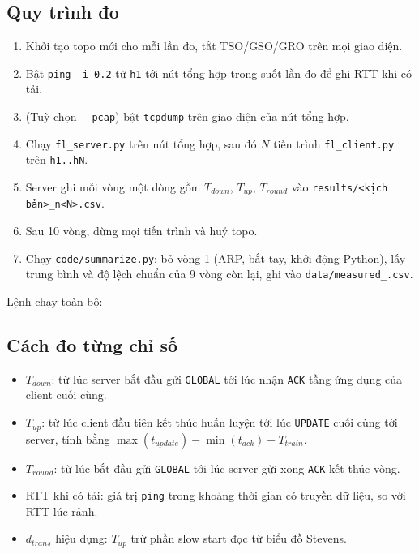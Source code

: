 \subsection{Quy trình đo}
\begin{enumerate}
    \item Khởi tạo topo mới cho mỗi lần đo, tắt TSO/GSO/GRO trên mọi giao diện.
    \item Bật \texttt{ping -i 0.2} từ \texttt{h1} tới nút tổng hợp trong suốt lần đo để ghi RTT khi có tải.
    \item (Tuỳ chọn \texttt{-{}-pcap}) bật \texttt{tcpdump} trên giao diện của nút tổng hợp.
    \item Chạy \texttt{fl\_server.py} trên nút tổng hợp, sau đó $N$ tiến trình \texttt{fl\_client.py} trên \texttt{h1..hN}.
    \item Server ghi mỗi vòng một dòng gồm $T_{down}$, $T_{up}$, $T_{round}$ vào \texttt{results/<kịch bản>\_n<N>.csv}.
    \item Sau 10 vòng, dừng mọi tiến trình và huỷ topo.
    \item Chạy \texttt{code/summarize.py}: bỏ vòng 1 (ARP, bắt tay, khởi động Python), lấy trung bình và độ lệch chuẩn của 9 vòng còn lại, ghi vào \texttt{data/measured\_<kịch bản>.csv}.
\end{enumerate}

Lệnh chạy toàn bộ:

\subsection{Cách đo từng chỉ số}
\begin{itemize}
    \item $T_{down}$: từ lúc server bắt đầu gửi \texttt{GLOBAL} tới lúc nhận \texttt{ACK} tầng ứng dụng của client cuối cùng.
    \item $T_{up}$: từ lúc client đầu tiên kết thúc huấn luyện tới lúc \texttt{UPDATE} cuối cùng tới server, tính bằng $\max(t_{update}) - \min(t_{ack}) - T_{train}$.
    \item $T_{round}$: từ lúc bắt đầu gửi \texttt{GLOBAL} tới lúc server gửi xong \texttt{ACK} kết thúc vòng.
    \item RTT khi có tải: giá trị \texttt{ping} trong khoảng thời gian có truyền dữ liệu, so với RTT lúc rảnh.
    \item $d_{trans}$ hiệu dụng: $T_{up}$ trừ phần slow start đọc từ biểu đồ Stevens.
\end{itemize}

